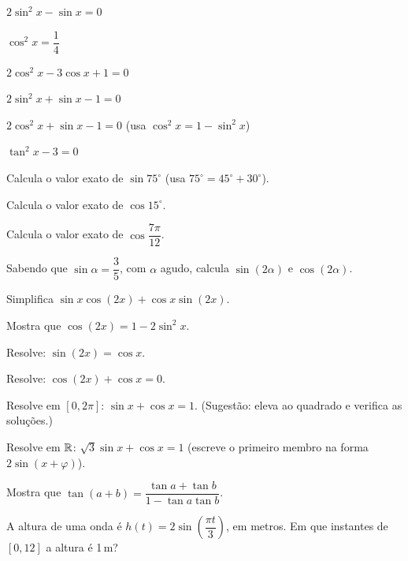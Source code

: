 \documentclass[12pt]{article}
\begin{document}
\begin{exercicios}
  \item $2\sin^2 x - \sin x = 0$
  \item $\cos^2 x = \dfrac{1}{4}$
  \item $2\cos^2 x - 3\cos x + 1 = 0$
  \item $2\sin^2 x + \sin x - 1 = 0$
  \item $2\cos^2 x + \sin x - 1 = 0$ \; (usa $\cos^2 x = 1 - \sin^2 x$)
  \item $\tan^2 x - 3 = 0$
\end{exercicios}

\begin{exercicios}
  \item Calcula o valor exato de $\sin 75^\circ$ (usa $75^\circ = 45^\circ + 30^\circ$).
  \item Calcula o valor exato de $\cos 15^\circ$.
  \item Calcula o valor exato de $\cos \dfrac{7\pi}{12}$.
  \item Sabendo que $\sin \alpha = \dfrac{3}{5}$, com $\alpha$ agudo, calcula $\sin(2\alpha)$ e $\cos(2\alpha)$.
  \item Simplifica $\sin x \cos(2x) + \cos x \sin(2x)$.
  \item Mostra que $\cos(2x) = 1 - 2\sin^2 x$.
  \item Resolve: $\sin(2x) = \cos x$.
  \item Resolve: $\cos(2x) + \cos x = 0$.
\end{exercicios}

\begin{exercicios}
  \item Resolve em $[0, 2\pi]$: $\sin x + \cos x = 1$. (Sugestão: eleva ao quadrado e verifica as soluções.)
  \item Resolve em $\mathbb{R}$: $\sqrt{3}\sin x + \cos x = 1$ (escreve o primeiro membro na forma $2\sin(x + \varphi)$).
  \item Mostra que $\tan(a + b) = \dfrac{\tan a + \tan b}{1 - \tan a \tan b}$.
  \item A altura de uma onda é $h(t) = 2\sin\left(\dfrac{\pi t}{3}\right)$, em metros. Em que instantes de $[0, 12]$ a altura é 1\,m?
\end{exercicios}
\end{document}

